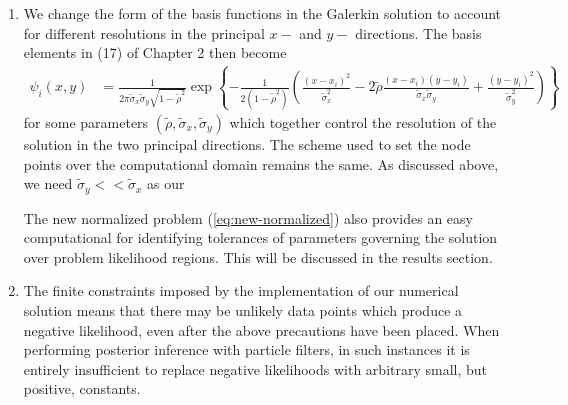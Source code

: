 \documentclass[10pt]{article}
\begin{document}
\begin{enumerate}
\item We change the form of the basis functions in the Galerkin
  solution to account for different resolutions in the principal $x-$
  and $y-$ directions. The basis elements in (17) of Chapter 2 then become
  \begin{align}
    \psi_i(x,y) &= \frac{1}{2\pi \tilde{\sigma}_x \tilde{\sigma}_y \sqrt{1-\tilde{\rho}^2}}  \exp\left\{ -\frac{1}{2(1-\tilde{\rho}^2)} \left( \frac{(x - x_i)^2}{\tilde{\sigma}_x^2} - 2\tilde{\rho} \frac{(x-x_i)(y-y_i)}{\tilde{\sigma}_x\tilde{\sigma}_y} +  \frac{(y - y_i)^2}{\tilde{\sigma}_y^2}  \right)  \right\}
\end{align}
for some parameters
$(\tilde{\rho}, \tilde{\sigma}_x, \tilde{\sigma}_y)$ which together
control the resolution of the solution in the two principal
directions. The scheme used to set the node points over the
computational domain remains the same. As discussed above, we need
$\tilde{\sigma}_y << \tilde{\sigma}_x$ as our 

The new normalized problem (\ref{eq:new-normalized}) also provides an
easy computational for identifying tolerances of parameters governing
the solution over problem likelihood regions. This will be discussed
in the results section. 

\item The finite constraints imposed by the implementation of our
  numerical solution means that there may be unlikely data points
  which produce a negative likelihood, even after the above
  precautions have been placed. When performing posterior inference
  with particle filters, in such instances it is entirely insufficient
  to replace negative likelihoods with arbitrary small, but positive,
  constants. 
\end{enumerate}
\end{document}
